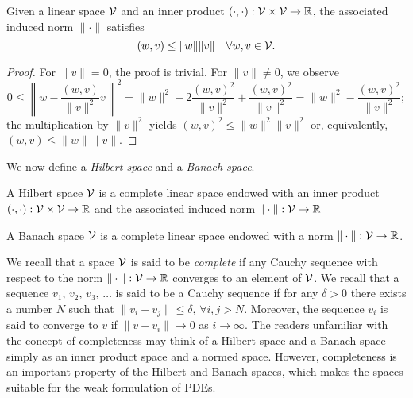 \begin{proposition}
  \label{prop:abs_cauchy_schwarz}
  Given a linear space $\mathcal{V}$ and an inner product $(\cdot, \cdot): \mathcal{V} \times \mathcal{V} \to \mathbb{R}$, the associated induced norm $\| \cdot \|$ satisfies
  \begin{equation*}
    (w,v) \leq \| w \| \| v \| \quad \forall w ,v \in \mathcal{V}.
  \end{equation*}
  \begin{proof}
    For $\|v\|=0$, the proof is trivial.  For $\| v \| \neq 0$, we observe
    \begin{equation*}
      0 \leq \left\| w - \frac{(w,v)}{\| v \|^2} v \right\|^2
      = \| w \|^2 - 2 \frac{(w,v)^2}{\| v \|^2} + \frac{(w,v)^2}{\| v \|^2}
      = \| w \|^2 - \frac{(w,v)^2}{\| v \|^2};
    \end{equation*}
    the multiplication by $\| v \|^2$ yields $(w,v)^2 \leq \| w \|^2 \| v \|^2$ or, equivalently, $(w,v) \leq \| w \| \| v \|$.
  \end{proof}
\end{proposition}

We now define a \emph{Hilbert space} and a \emph{Banach space}.
\begin{definition}
  A Hilbert space $\mathcal{V}$ is a complete linear space endowed with an inner product $(\cdot,\cdot): \mathcal{V} \times \mathcal{V} \to \mathbb{R}$ and the associated induced norm $\| \cdot \|: \mathcal{V} \to \mathbb{R}$ 
\end{definition}
\begin{definition}
  A Banach space $\mathcal{V}$ is a complete linear space endowed with a norm $\| \cdot \|: \mathcal{V} \to \mathbb{R}$.
\end{definition}
We recall that a space $\mathcal{V}$ is said to be \emph{complete} if any Cauchy sequence with respect to the norm $\| \cdot \|: \mathcal{V} \to \mathbb{R}$ converges to an element of $\mathcal{V}$.  We recall that a sequence $v_1$, $v_2$, $v_3$, $\dots$ is said to be a Cauchy sequence if for any $\delta > 0$ there exists a number $N$ such that $\| v_i - v_j \| \leq \delta$, $\forall i,j  > N$.  Moreover, the sequence $v_i$ is said to converge to $v$ if $\| v - v_i \| \to 0$ as $i \to \infty$. The readers unfamiliar with the concept of completeness may think of a Hilbert space and a Banach space simply as an inner product space and a normed space. However, completeness is an important property of the Hilbert and Banach spaces, which makes the spaces suitable for the weak formulation of PDEs.

